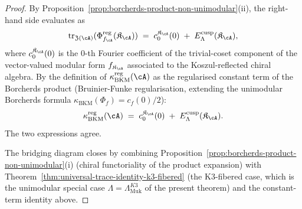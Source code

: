 \begin{proof}
By Proposition~\ref{prop:borcherds-product-non-unimodular}(ii), the
right-hand side evaluates as
\[
 \mathrm{tr}_{\mathfrak{Z}(\cA)}(\Phi^{\mathrm{reg}}_{f_\cA}(\mathfrak{K}_\cA)) \;=\; c_0^{\mathfrak{K}_\cA}(0) \;+\; E_\Lambda^{\mathrm{cusp}}(\mathfrak{K}_\cA),
\]
where $c_0^{\mathfrak{K}_\cA}(0)$ is the $0$-th Fourier coefficient of
the trivial-coset component of the vector-valued modular form
$f_{\mathfrak{K}_\cA}$ associated to the Koszul-reflected chiral algebra.
By the definition of $\kappa_{\mathrm{BKM}}^{\mathrm{reg}}(\cA)$ as the
regularised constant term of the Borcherds product
\textup{(}Bruinier-Funke regularisation, extending the unimodular
Borcherds formula
\(\kappa_{\mathrm{BKM}}(\Phi_f)=c_f(0)/2\)\textup{):}
\[
 \kappa_{\mathrm{BKM}}^{\mathrm{reg}}(\cA) \;=\; c_0^{\mathfrak{K}_\cA}(0) \;+\; E_\Lambda^{\mathrm{cusp}}(\mathfrak{K}_\cA).
\]
The two expressions agree.

The bridging diagram closes by combining
Proposition~\ref{prop:borcherds-product-non-unimodular}(i) (chiral
functoriality of the product expansion) with
Theorem~\ref{thm:universal-trace-identity-k3-fibered} (the K$3$-fibered
case, which is the unimodular special case
$\Lambda = \Lambda_{\mathrm{Muk}}^{K3}$ of the present theorem) and the
constant-term identity above.
\end{proof}

